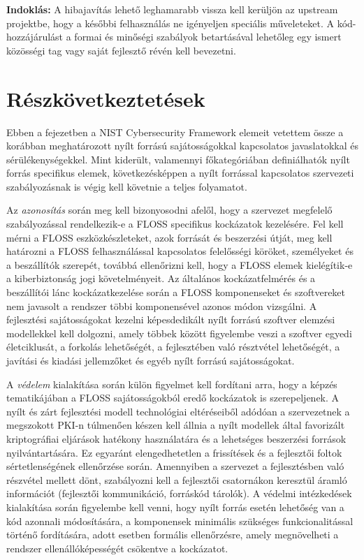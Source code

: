 \documentclass[12pt,magyar,a4paper,oneside]{scrreprt}
\begin{document}
\textbf{Indoklás: } A hibajavítás lehető leghamarabb vissza kell
kerüljön az upstream projektbe, hogy a későbbi felhasználás ne
igényeljen speciális műveleteket. A kód-hozzájárulást a formai és
minőségi szabályok betartásával lehetőleg egy ismert közösségi tag vagy
saját fejlesztő révén kell bevezetni.

\hypertarget{ruxe9szkuxf6vetkeztetuxe9sek-2}{%
\section{Részkövetkeztetések}\label{ruxe9szkuxf6vetkeztetuxe9sek-2}}

Ebben a fejezetben a NIST Cybersecurity Framework elemeit vetettem össze
a korábban meghatározott nyílt forrású sajátosságokkal kapcsolatos
javaslatokkal és sérülékenységekkel. Mint kiderült, valamennyi
főkategóriában definiálhatók nyílt forrás specifikus elemek,
következésképpen a nyílt forrással kapcsolatos szervezeti szabályozásnak
is végig kell követnie a teljes folyamatot.

Az \emph{azonosítás} során meg kell bizonyosodni afelől, hogy a
szervezet megfelelő szabályozással rendelkezik-e a FLOSS specifikus
kockázatok kezelésére. Fel kell mérni a FLOSS eszközkészleteket, azok
forrását és beszerzési útját, meg kell határozni a FLOSS felhasználással
kapcsolatos felelősségi köröket, személyeket és a beszállítók szerepét,
továbbá ellenőrizni kell, hogy a FLOSS elemek kielégítik-e a
kiberbiztonság jogi követelményeit. Az általános kockázatfelmérés és a
beszállítói lánc kockázatkezelése során a FLOSS komponenseket és
szoftvereket nem javasolt a rendszer többi komponensével azonos módon
vizsgálni. A fejlesztési sajátosságokat kezelni képesdedikált nyílt
forrású szoftver elemzési modellekkel kell dolgozni, amely többek között
figyelembe veszi a szoftver egyedi életciklusát, a forkolás lehetőségét,
a fejlesztében való résztvétel lehetőségét, a javítási és kiadási
jellemzőket és egyéb nyílt forrású sajátosságokat.

A \emph{védelem} kialakítása során külön figyelmet kell fordítani arra,
hogy a képzés tematikájában a FLOSS sajátosságokból eredő kockázatok is
szerepeljenek. A nyílt és zárt fejlesztési modell technológiai
eltéréseiből adódóan a szervezetnek a megszokott PKI-n túlmenően készen
kell állnia a nyílt modellek által favorizált kriptográfiai eljárások
hatékony használatára és a lehetséges beszerzési források
nyilvántartására. Ez egyaránt elengedhetetlen a frissítések és a
fejlesztői foltok sértetlenségének ellenőrzése során. Amennyiben a
szervezet a fejlesztésben való részvétel mellett dönt, szabályozni kell
a fejlesztői csatornákon keresztül áramló információt (fejlesztői
kommunikáció, forráskód tárolók). A védelmi intézkedések kialakítása
során figyelembe kell venni, hogy nyílt forrás esetén lehetőség van a
kód azonnali módosítására, a komponensek minimális szükséges
funkcionalitással történő fordítására, adott esetben formális
ellenőrzésre, amely megnövelheti a rendszer ellenállóképességét
csökentve a kockázatot.
\end{document}
